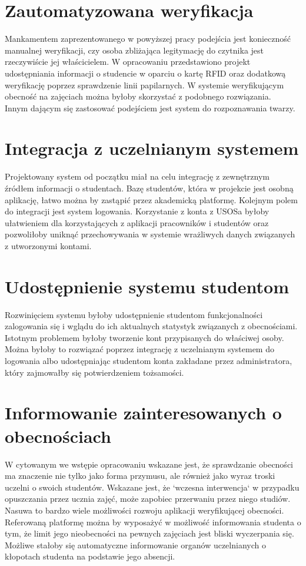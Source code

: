 \documentclass[declaration,shortabstract, mgr]{iithesis}
\begin{document}
\section{Zautomatyzowana weryfikacja}
\indent Mankamentem zaprezentowanego w powyższej pracy podejścia jest konieczność manualnej weryfikacji, czy osoba zbliżająca legitymację do czytnika jest rzeczywiście jej właścicielem. W opracowaniu \cite{fingerprint} przedstawiono projekt udostępniania informacji o studencie w oparciu o kartę RFID oraz dodatkową weryfikację poprzez sprawdzenie linii papilarnych. W systemie weryfikującym obecność na zajęciach można byłoby skorzystać z podobnego rozwiązania.\\
\indent Innym dającym się zastosować podejściem jest system do rozpoznawania twarzy.
\section{Integracja z uczelnianym systemem}
\indent Projektowany system od początku miał na celu integrację z zewnętrznym źródłem informacji o studentach. Bazę studentów, która w projekcie jest osobną aplikację, łatwo można by zastąpić przez akademicką platformę. Kolejnym polem do integracji jest system logowania. Korzystanie z konta z USOSa byłoby ułatwieniem dla korzystających z aplikacji pracowników i studentów oraz pozwoliłoby uniknąć przechowywania w systemie wrażliwych danych związanych z utworzonymi kontami.
\section{Udostępnienie systemu studentom}
\indent Rozwinięciem systemu byłoby udostępnienie studentom funkcjonalności zalogowania się i wglądu do ich aktualnych statystyk związanych z obecnościami. Istotnym problemem byłoby tworzenie kont przypisanych do właściwej osoby. Można byłoby to rozwiązać poprzez integrację z uczelnianym systemem do logowania albo udostępniając studentom konta zakładane przez administratora, który zajmowałby się potwierdzeniem tożsamości.
\section{Informowanie zainteresowanych o obecnościach}
\indent W cytowanym we wstępie opracowaniu \cite{theory_base} wskazane jest, że sprawdzanie obecności ma znaczenie nie tylko jako forma przymusu, ale również jako wyraz troski uczelni o swoich studentów. Wskazane jest, że `wczesna interwencja` w przypadku opuszczania przez ucznia zajęć, może zapobiec przerwaniu przez niego studiów. Nasuwa to bardzo wiele możliwości rozwoju aplikacji weryfikującej obecności. Referowaną platformę można by wyposażyć w możliwość informowania studenta o tym, że limit jego nieobecności na pewnych zajęciach jest bliski wyczerpania się. \\
\indent Możliwe stałoby się automatyczne informowanie organów uczelnianych o kłopotach studenta na podstawie jego absencji. \\
\end{document}
